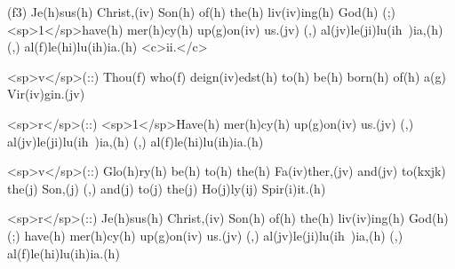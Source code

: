 (f3) Je(h)sus(h) Christ,(iv) Son(h) of(h) the(h) liv(iv)ing(h) God(h) (;) <sp>1</sp>have(h) mer(h)cy(h) up(g)on(iv) us.(jv) (,) al(jv)le(ji)lu(ih~)ia,(h) (,) al(f)le(hi)lu(ih)ia.(h) <c>ii.</c>

<sp>v</sp>(::) Thou(f) who(f) deign(iv)edst(h) to(h) be(h) born(h) of(h) a(g) Vir(iv)gin.(jv)

<sp>r</sp>(::) <sp>1</sp>Have(h) mer(h)cy(h) up(g)on(iv) us.(jv) (,) al(jv)le(ji)lu(ih~)ia,(h) (,) al(f)le(hi)lu(ih)ia.(h)

<sp>v</sp>(::)  Glo(h)ry(h) be(h) to(h) the(h) Fa(iv)ther,(jv) and(jv) to(kxjk) the(j) Son,(j) (,) and(j) to(j) the(j) Ho(j)ly(ij) Spir(i)it.(h)

<sp>r</sp>(::) Je(h)sus(h) Christ,(iv) Son(h) of(h) the(h) liv(iv)ing(h) God(h) (;) have(h) mer(h)cy(h) up(g)on(iv) us.(jv) (,) al(jv)le(ji)lu(ih~)ia,(h) (,) al(f)le(hi)lu(ih)ia.(h)
